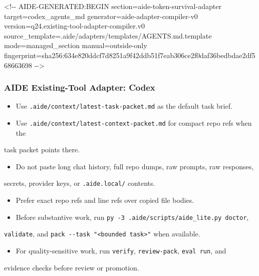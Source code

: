 \documentclass[9pt,a4paper,openany]{book}
\begin{document}
<!-\allowbreak{}-\allowbreak{} AIDE-\allowbreak{}GENERATED:BEGIN section=aide-\allowbreak{}token-\allowbreak{}survival-\allowbreak{}adapter target=codex\_\allowbreak{}agents\_\allowbreak{}md generator=aide-\allowbreak{}adapter-\allowbreak{}compiler-\allowbreak{}v0 version=q24.\allowbreak{}existing-\allowbreak{}tool-\allowbreak{}adapter-\allowbreak{}compiler.\allowbreak{}v0 source\_\allowbreak{}template=.\allowbreak{}aide/\allowbreak{}adapters/\allowbreak{}templates/\allowbreak{}AGENTS.\allowbreak{}md.\allowbreak{}template mode=managed\_\allowbreak{}section manual=outside-\allowbreak{}only fingerprint=sha256:634e820ddcf7d8251a9f42ddb51f7eab306ce2f0daf36bedbdae2df568663698 -\allowbreak{}-\allowbreak{}>

\subsubsection{AIDE Existing-Tool Adapter: Codex}

\begin{itemize}
\item Use \texttt{.\allowbreak{}aide/\allowbreak{}context/\allowbreak{}latest-\allowbreak{}task-\allowbreak{}packet.\allowbreak{}md} as the default task brief.\allowbreak{}
\item Use \texttt{.\allowbreak{}aide/\allowbreak{}context/\allowbreak{}latest-\allowbreak{}context-\allowbreak{}packet.\allowbreak{}md} for compact repo refs when the
\end{itemize}
task packet points there.\allowbreak{}

\begin{itemize}
\item Do not paste long chat history, full repo dumps, raw prompts, raw responses,
\end{itemize}
secrets, provider keys, or \texttt{.\allowbreak{}aide.\allowbreak{}local/\allowbreak{}} contents.\allowbreak{}

\begin{itemize}
\item Prefer exact repo refs and line refs over copied file bodies.\allowbreak{}
\item Before substantive work, run \texttt{py -\allowbreak{}3 .\allowbreak{}aide/\allowbreak{}scripts/\allowbreak{}aide\_\allowbreak{}lite.\allowbreak{}py doctor},
\end{itemize}
\texttt{validate}, and \texttt{pack -\allowbreak{}-\allowbreak{}task "<bounded task>"} when available.\allowbreak{}

\begin{itemize}
\item For quality-\allowbreak{}sensitive work, run \texttt{verify}, \texttt{review-\allowbreak{}pack}, \texttt{eval run}, and
\end{itemize}
evidence checks before review or promotion.\allowbreak{}
\end{document}
